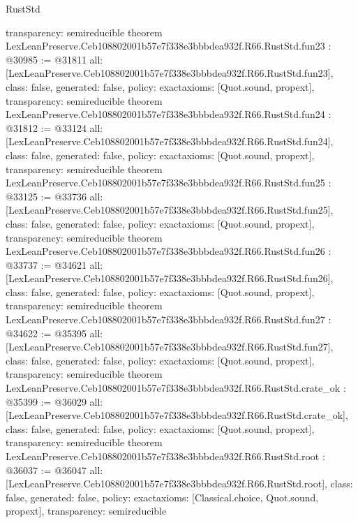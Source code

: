 \begin{lexlean}{RustStd}
\begin{coremodule}
{  transparency: semireducible
}
theorem LexLeanPreserve.Ceb108802001b57e7f338e3bbbdea932f.R66.RustStd.fun23 : @30985 := @31811 {
  all: [LexLeanPreserve.Ceb108802001b57e7f338e3bbbdea932f.R66.RustStd.fun23],
  class: false,
  generated: false,
  policy: exact{axioms: [Quot.sound, propext]},
  transparency: semireducible
}
theorem LexLeanPreserve.Ceb108802001b57e7f338e3bbbdea932f.R66.RustStd.fun24 : @31812 := @33124 {
  all: [LexLeanPreserve.Ceb108802001b57e7f338e3bbbdea932f.R66.RustStd.fun24],
  class: false,
  generated: false,
  policy: exact{axioms: [Quot.sound, propext]},
  transparency: semireducible
}
theorem LexLeanPreserve.Ceb108802001b57e7f338e3bbbdea932f.R66.RustStd.fun25 : @33125 := @33736 {
  all: [LexLeanPreserve.Ceb108802001b57e7f338e3bbbdea932f.R66.RustStd.fun25],
  class: false,
  generated: false,
  policy: exact{axioms: [Quot.sound, propext]},
  transparency: semireducible
}
theorem LexLeanPreserve.Ceb108802001b57e7f338e3bbbdea932f.R66.RustStd.fun26 : @33737 := @34621 {
  all: [LexLeanPreserve.Ceb108802001b57e7f338e3bbbdea932f.R66.RustStd.fun26],
  class: false,
  generated: false,
  policy: exact{axioms: [Quot.sound, propext]},
  transparency: semireducible
}
theorem LexLeanPreserve.Ceb108802001b57e7f338e3bbbdea932f.R66.RustStd.fun27 : @34622 := @35395 {
  all: [LexLeanPreserve.Ceb108802001b57e7f338e3bbbdea932f.R66.RustStd.fun27],
  class: false,
  generated: false,
  policy: exact{axioms: [Quot.sound, propext]},
  transparency: semireducible
}
theorem LexLeanPreserve.Ceb108802001b57e7f338e3bbbdea932f.R66.RustStd.crate_ok : @35399 := @36029 {
  all: [LexLeanPreserve.Ceb108802001b57e7f338e3bbbdea932f.R66.RustStd.crate_ok],
  class: false,
  generated: false,
  policy: exact{axioms: [Quot.sound, propext]},
  transparency: semireducible
}
theorem LexLeanPreserve.Ceb108802001b57e7f338e3bbbdea932f.R66.RustStd.root : @36037 := @36047 {
  all: [LexLeanPreserve.Ceb108802001b57e7f338e3bbbdea932f.R66.RustStd.root],
  class: false,
  generated: false,
  policy: exact{axioms: [Classical.choice, Quot.sound, propext]},
  transparency: semireducible
}


\end{coremodule}
\end{lexlean}
